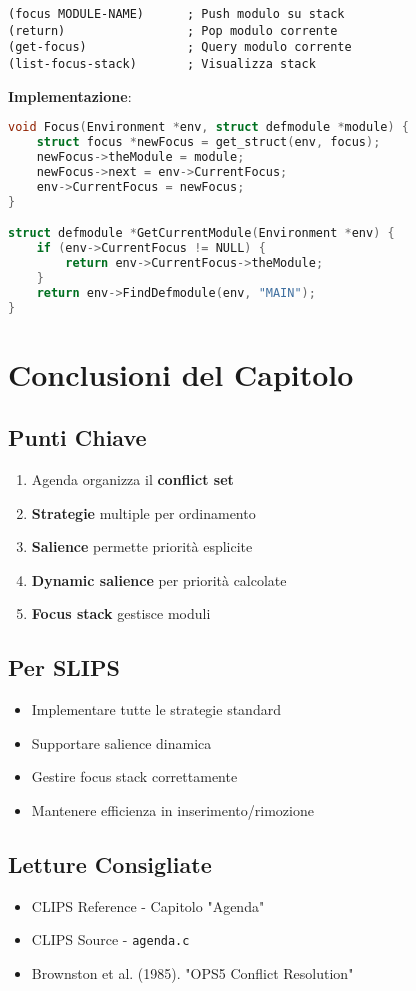 \begin{lstlisting}[language=CLIPS]
(focus MODULE-NAME)      ; Push modulo su stack
(return)                 ; Pop modulo corrente
(get-focus)              ; Query modulo corrente
(list-focus-stack)       ; Visualizza stack
\end{lstlisting}

\textbf{Implementazione}:

\begin{lstlisting}[language=C]
void Focus(Environment *env, struct defmodule *module) {
    struct focus *newFocus = get_struct(env, focus);
    newFocus->theModule = module;
    newFocus->next = env->CurrentFocus;
    env->CurrentFocus = newFocus;
}

struct defmodule *GetCurrentModule(Environment *env) {
    if (env->CurrentFocus != NULL) {
        return env->CurrentFocus->theModule;
    }
    return env->FindDefmodule(env, "MAIN");
}
\end{lstlisting}

\section{Conclusioni del Capitolo}

\subsection{Punti Chiave}

\begin{enumerate}
\item Agenda organizza il \textbf{conflict set}
\item \textbf{Strategie} multiple per ordinamento
\item \textbf{Salience} permette priorità esplicite
\item \textbf{Dynamic salience} per priorità calcolate
\item \textbf{Focus stack} gestisce moduli
\end{enumerate}

\subsection{Per SLIPS}

\begin{itemize}
\item Implementare tutte le strategie standard
\item Supportare salience dinamica
\item Gestire focus stack correttamente
\item Mantenere efficienza in inserimento/rimozione
\end{itemize}

\subsection{Letture Consigliate}

\begin{itemize}
\item CLIPS Reference - Capitolo "Agenda"
\item CLIPS Source - \texttt{agenda.c}
\item Brownston et al. (1985). "OPS5 Conflict Resolution"
\end{itemize}
